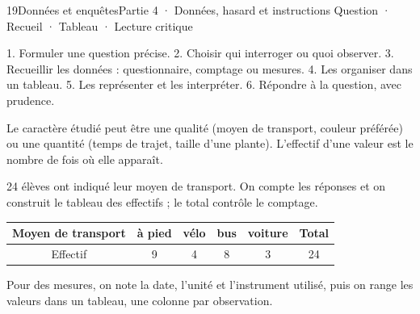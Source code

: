 \begin{ouverture}[statistiques]{19}{Données et enquêtes}{Partie 4 · Données, hasard et instructions}
{Question · Recueil · Tableau · Lecture critique}
\end{ouverture}
\pagestyle{otMain}\essentiel\fontsize{11}{15}\selectfont
{}\label{cours-19-1}
\begin{savoirfaire}1. Formuler une question précise. 2. Choisir qui interroger ou quoi observer. 3. Recueillir les données : questionnaire, comptage ou mesures. 4. Les organiser dans un tableau. 5. Les représenter et les interpréter. 6. Répondre à la question, avec prudence.\end{savoirfaire}
\begin{definition}Le caractère étudié peut être une qualité (moyen de transport, couleur préférée) ou une quantité (temps de trajet, taille d’une plante). L’effectif d’une valeur est le nombre de fois où elle apparaît.\end{definition}
\begin{exemple}24 élèves ont indiqué leur moyen de transport. On compte les réponses et on construit le tableau des effectifs ; le total contrôle le comptage.\begin{center}\renewcommand{\arraystretch}{1.35}\begin{tabular}{c|ccccc}\toprule
Moyen de transport & à pied & vélo & bus & voiture & Total\\\midrule
Effectif & 9 & 4 & 8 & 3 & 24\\
\bottomrule\end{tabular}\end{center}\end{exemple}
\begin{savoirfaire}Pour des mesures, on note la date, l’unité et l’instrument utilisé, puis on range les valeurs dans un tableau, une colonne par observation.\end{savoirfaire}
\clearpage
{}\label{cours-19-2}
\label{fig-cours-19-2-cours-graphiques}

